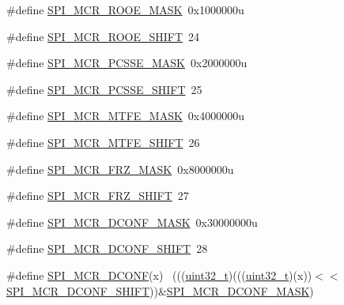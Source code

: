 \begin{DoxyCompactItemize}
\item 
\#define \hyperlink{group___s_p_i___register___masks_ga2f3c41dcffc0058ae83ae7b1dbfffd86}{S\+P\+I\+\_\+\+M\+C\+R\+\_\+\+R\+O\+O\+E\+\_\+\+M\+A\+SK}~0x1000000u
\item 
\#define \hyperlink{group___s_p_i___register___masks_ga78f4dfaad41aae2ee10979f2e248e4d3}{S\+P\+I\+\_\+\+M\+C\+R\+\_\+\+R\+O\+O\+E\+\_\+\+S\+H\+I\+FT}~24
\item 
\#define \hyperlink{group___s_p_i___register___masks_ga479a7a3131d4356e53f7f86bd4cd0245}{S\+P\+I\+\_\+\+M\+C\+R\+\_\+\+P\+C\+S\+S\+E\+\_\+\+M\+A\+SK}~0x2000000u
\item 
\#define \hyperlink{group___s_p_i___register___masks_ga4dc49f49441cc797619c160757bd7d2d}{S\+P\+I\+\_\+\+M\+C\+R\+\_\+\+P\+C\+S\+S\+E\+\_\+\+S\+H\+I\+FT}~25
\item 
\#define \hyperlink{group___s_p_i___register___masks_ga3fa9d02b4302f9963c26383bdeb35da8}{S\+P\+I\+\_\+\+M\+C\+R\+\_\+\+M\+T\+F\+E\+\_\+\+M\+A\+SK}~0x4000000u
\item 
\#define \hyperlink{group___s_p_i___register___masks_gaaff9ea9fcaf46dc8bfd358d941e0d3ac}{S\+P\+I\+\_\+\+M\+C\+R\+\_\+\+M\+T\+F\+E\+\_\+\+S\+H\+I\+FT}~26
\item 
\#define \hyperlink{group___s_p_i___register___masks_ga6d4131c2e45352910d630723c1172d2c}{S\+P\+I\+\_\+\+M\+C\+R\+\_\+\+F\+R\+Z\+\_\+\+M\+A\+SK}~0x8000000u
\item 
\#define \hyperlink{group___s_p_i___register___masks_ga7500a54a21171d20a3bbf0355350c9bd}{S\+P\+I\+\_\+\+M\+C\+R\+\_\+\+F\+R\+Z\+\_\+\+S\+H\+I\+FT}~27
\item 
\#define \hyperlink{group___s_p_i___register___masks_gab6f80a07ce3be21ee0de56c3de90f380}{S\+P\+I\+\_\+\+M\+C\+R\+\_\+\+D\+C\+O\+N\+F\+\_\+\+M\+A\+SK}~0x30000000u
\item 
\#define \hyperlink{group___s_p_i___register___masks_ga5f84d391d6b5838c50b44217617d66a8}{S\+P\+I\+\_\+\+M\+C\+R\+\_\+\+D\+C\+O\+N\+F\+\_\+\+S\+H\+I\+FT}~28
\item 
\#define \hyperlink{group___s_p_i___register___masks_gaa402d5f6da9c9ba06834c77dba6eb9d9}{S\+P\+I\+\_\+\+M\+C\+R\+\_\+\+D\+C\+O\+NF}(x)                                              ~(((\hyperlink{_p_e___types_8h_a33594304e786b158f3fb30289278f5af}{uint32\+\_\+t})(((\hyperlink{_p_e___types_8h_a33594304e786b158f3fb30289278f5af}{uint32\+\_\+t})(x))$<$$<$\hyperlink{group___s_p_i___register___masks_ga5f84d391d6b5838c50b44217617d66a8}{S\+P\+I\+\_\+\+M\+C\+R\+\_\+\+D\+C\+O\+N\+F\+\_\+\+S\+H\+I\+FT}))\&\hyperlink{group___s_p_i___register___masks_gab6f80a07ce3be21ee0de56c3de90f380}{S\+P\+I\+\_\+\+M\+C\+R\+\_\+\+D\+C\+O\+N\+F\+\_\+\+M\+A\+SK})
$$
\end{DoxyCompactItemize}

